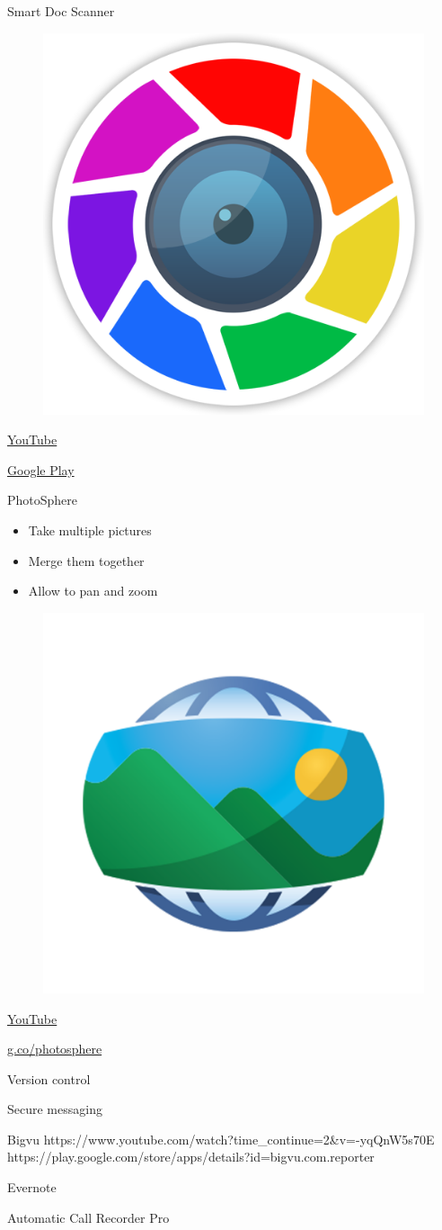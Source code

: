\documentclass[serif,14pt,color=usenames,dvipsnames]{beamer}
\begin{document}
\begin{frame}{Smart Doc Scanner}
  \centering

  \begin{figure}
  \includegraphics[width=0.3\linewidth]{imgs/sds}
  \end{figure}

  \href{https://www.youtube.com/watch?v=zAcMvZpTeBo}{YouTube }

  \href{https://play.google.com/store/apps/details?id=com.mobilicy.docscanner}{Google
  Play }
\end{frame}

\begin{frame}{PhotoSphere}

  \begin{itemize}
    \item Take multiple pictures
    \item Merge them together
    \item Allow to pan and zoom
  \end{itemize}

  \centering

  \begin{figure}
  \includegraphics[width=0.3\linewidth]{imgs/photosphere}
  \end{figure}

  \href{https://www.youtube.com/watch?v=NPs3eIiWRaw}{YouTube }

  \href{https://g.co/photosphere}{g.co/photosphere }

\end{frame}

\begin{frame}{Version control}

\end{frame}

\begin{frame}{Secure messaging}
\end{frame}

\begin{frame}{Bigvu}
https://www.youtube.com/watch?time_continue=2&v=-yqQnW5s70E
https://play.google.com/store/apps/details?id=bigvu.com.reporter
\end{frame}

\begin{frame}{Evernote}
\end{frame}

\begin{frame}{Automatic Call Recorder Pro}
\end{frame}
\end{document}
